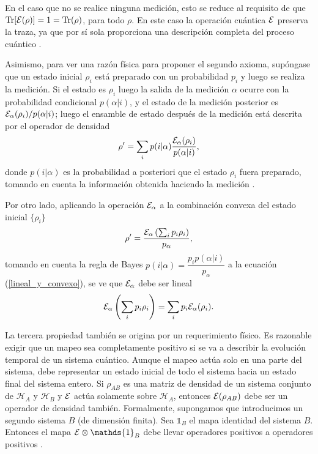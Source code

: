 En el caso que no se realice ninguna medición, esto se reduce al requisito de
que ${\rm Tr}[\mathcal{E}(\rho)] = 1 = {\rm Tr}(\rho)$, para todo $\rho$. En este caso la
operación cuántica $\mathcal{E}$ preserva la traza, ya que por sí sola proporciona una
descripción completa del proceso cuántico 
{\cite{nielsen_chuang_2010}}.



Asimismo, para ver una razón física para proponer el segundo axioma, supóngase que un estado inicial $\rho_i$ está preparado con un probabilidad $p_i$ y luego se realiza la medición. Si el estado es $\rho_i $ luego la salida de la medición  $\alpha$ ocurre con la probabilidad condicional $p(\alpha|i)$, y el estado de la medición  posterior es $\mathcal{E}_\alpha(\rho_i)/p(\alpha|i)$; luego el ensamble de estado después de la medición está descrita por el operador de densidad 
\begin{equation}\label{lineal_y_convexo}
    \rho'=\sum_i p(i|\alpha)\dfrac{\mathcal{E}_\alpha(\rho_i)}{p(\alpha|i)},
\end{equation}
donde $p(i|\alpha)$ es la probabilidad a posteriori que el estado $\rho_i$
fuera preparado, tomando en cuenta la información obtenida haciendo la medición
{\cite{preskill2020quantum}}. 

Por otro lado, aplicando la operación $\mathcal{E}_\alpha$  a la combinación convexa del
estado inicial $\{\rho_i\}$ \begin{equation}
    \rho'=\dfrac{\mathcal{E}_\alpha\left(\sum_i p_i \rho_i\right)}{p_\alpha},
\end{equation} tomando en cuenta la regla de Bayes  $p(i|\alpha)=\dfrac{p_i
p(\alpha|i)}{ p_\alpha} $ a la ecuación ({\ref{lineal_y_convexo}}),  se ve que
$\mathcal{E}_\alpha$ debe ser lineal {\cite{preskill2020quantum}} 
\begin{equation}
    \mathcal{E}_\alpha\left(\sum_i p_i \rho_i\right)=\sum_i p_i\mathcal{E}_\alpha(\rho_i). 
\end{equation}

La tercera propiedad también se origina por un requerimiento físico. Es
razonable exigir que un mapeo sea completamente positivo si se va a describir
la evolución temporal de un sistema cuántico. Aunque el mapeo actúa solo en una
parte del sistema, debe representar un estado inicial de todo el sistema hacia
un estado final del sistema entero. Si $\rho_{AB}$ es una matriz de densidad de
un sistema conjunto de $\mathcal{H}_A$ y $\mathcal{H}_{B}$  y $\mathcal{E}$ actúa
solamente sobre $\mathcal{H}_A$, entonces $\mathcal{E}(\rho_{AB})$  debe ser un operador
de densidad también. Formalmente, supongamos que introducimos un segundo
sistema $B$ (de dimensión finita). Sea $\mathds{1}_{B}$ el mapa identidad del
sistema $B$. Entonces el mapa $\E\otimes \mathds{1}_{B}$ debe llevar operadores
positivos a operadores positivos {\cite{nielsen_chuang_2010, preskill2020quantum}}. 


